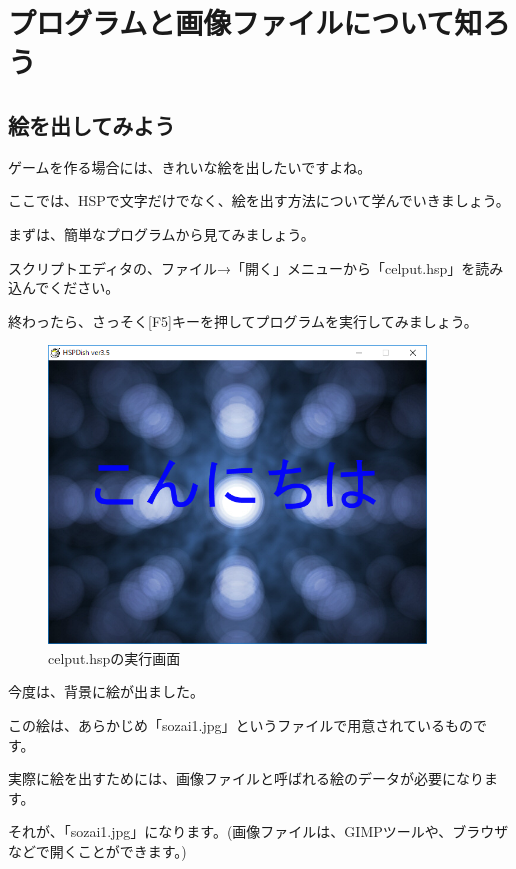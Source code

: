 \newpage
\section{プログラムと画像ファイルについて知ろう}


\subsection{絵を出してみよう}


ゲームを作る場合には、きれいな絵を出したいですよね。

ここでは、HSPで文字だけでなく、絵を出す方法について学んでいきましょう。

\bigskip

まずは、簡単なプログラムから見てみましょう。

スクリプトエディタの、ファイル→「開く」メニューから「celput.hsp」を読み込んでください。

終わったら、さっそく[F5]キーを押してプログラムを実行してみましょう。


\begin{figure}[H]
    \begin{center}
      \includegraphics[keepaspectratio,width=10.028cm,height=7.909cm]{text04-img/text04-img012.png}
      \caption{celput.hspの実行画面}
    \end{center}
    \label{fig:prog_menu}
\end{figure}


今度は、背景に絵が出ました。

この絵は、あらかじめ「sozai1.jpg」というファイルで用意されているものです。

実際に絵を出すためには、画像ファイルと呼ばれる絵のデータが必要になります。

それが、「sozai1.jpg」になります。(画像ファイルは、GIMPツールや、ブラウザなどで開くことができます。)


